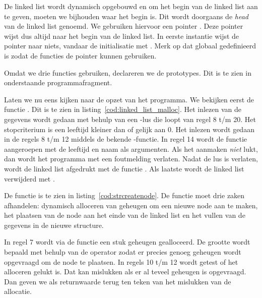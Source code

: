 
De linked list wordt dynamisch opgebouwd en om het begin van de linked list aan te geven, moeten we bijhouden waar het begin is. Dit wordt doorgaans de \textsl{head} van de linked list genoemd. We gebruiken hiervoor een pointer . Deze pointer wijst dus altijd naar het begin van de linked list. In eerste instantie wijst de pointer naar niets, vandaar de initialisatie met . Merk op dat  globaal gedefinieerd is zodat de functies de pointer kunnen gebruiken.


Omdat we drie functies gebruiken, declareren we de prototypes. Dit is te zien in onderstaande programmafragment.


Laten we nu eens kijken naar de opzet van het programma. We bekijken eerst de functie . Dit is te zien in listing~\ref{cod:linked_list_malloc}.
%
%
Het inlezen van de gegevens wordt gedaan met behulp van een \mbox{}-lus die loopt van regel 8 t/m 20. Het stopcriterium is een leeftijd kleiner dan of gelijk aan 0. Het inlezen wordt gedaan in de regels 8 t/m 12 middels de bekende -functie. In regel 14 wordt de functie  aangeroepen met de leeftijd en naam als argumenten. Als het aanmaken \textsl{niet} lukt, dan wordt het programma met een foutmelding verlaten. Nadat de lus is verlaten, wordt de linked list afgedrukt met de functie . Als laatste wordt de linked list verwijderd met .

De functie  is te zien in listing~\ref{cod:strcreatenode}. De functie moet drie zaken afhandelen: dynamisch alloceren van geheugen om een nieuwe node aan te maken, het plaatsen van de node aan het einde van de linked list en het vullen van de gegevens in de nieuwe structure.


In regel 7 wordt via de functie  een stuk geheugen gealloceerd. De grootte wordt bepaald met behulp van de operator  zodat er precies genoeg geheugen wordt opgevraagd om de node te plaatsen. In regels 10 t/m 12 wordt getest of het alloceren gelukt is. Dat kan mislukken als er al teveel geheugen is opgevraagd. Dan geven we als returnwaarde  terug ten teken van het mislukken van de allocatie.


